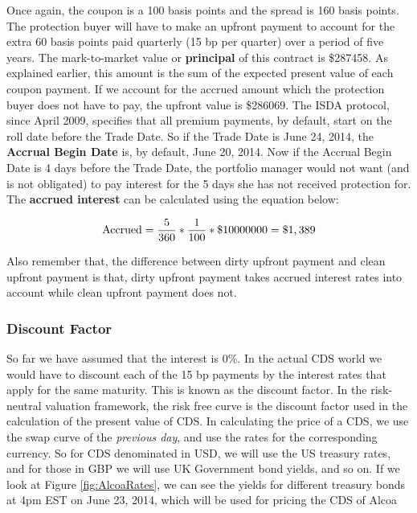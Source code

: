 \documentclass[article]{jss}
\begin{document}
Once again, the coupon is a 100 basis points and the spread is 160 basis points. The protection buyer will have to make an upfront payment to account for the extra 60 basis points paid quarterly (15 bp per quarter) over a period of five years. The mark-to-market value or \textbf{principal} of this contract is \$287458. As explained earlier, this amount is the sum of the expected present value of each coupon payment. If we account for the accrued amount which the protection buyer does not have to pay, the upfront value is \$286069. The ISDA protocol, since April 2009, specifies that all premium payments, by default, start on the roll date before the Trade Date. So if the Trade Date is June 24, 2014, the \textbf{Accrual Begin Date} is, by default, June 20, 2014. Now if the Accrual Begin Date is 4 days before the Trade Date, the portfolio manager would not want (and is not obligated) to pay interest for the 5 days she has not received protection for. The \textbf{accrued interest} can be calculated using the equation below:

\begin{equation}
 \begin{aligned}
  {\rm Accrued = \frac{5}{360}*\frac{1}{100}*\$10000000 = \$1,389}
    \end{aligned}
\end{equation}

Also remember that, the difference between dirty upfront payment and clean upfront payment is that, dirty upfront payment takes accrued interest rates into account while clean upfront payment does not.

\subsubsection{Discount Factor}

So far we have assumed that the interest is 0\%. In the actual CDS world we would have to discount each of the 15 bp payments by the interest rates that apply for the same maturity. This is known as the discount factor. In the risk-neutral valuation framework, the risk free curve is the discount factor used in the calculation of the present value of CDS. In calculating the price of a CDS, we use the swap curve of the \textit{previous day}, and use the rates for the corresponding currency. So for CDS denominated in USD, we will use the US treasury rates, and for those in GBP we will use UK Government bond yields, and so on. If we look at Figure \ref{fig:AlcoaRates}, we can see the yields for different treasury bonds at 4pm EST on June 23, 2014, which will be used for pricing the CDS of Alcoa
\end{document}
